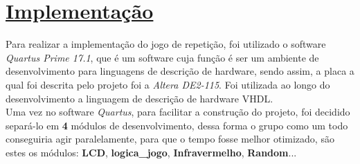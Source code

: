 \documentclass[14pt, oneside]{book}
\newcommand\tab[1][1cm]{\hspace*{#1}}
\theoremstyle{definition}
\begin{document}
            
        \chapter[Implementação]{\hyperlink{toc}{Implementação}}
            \tab Para realizar a implementação do jogo de repetição, foi utilizado o software \textit{Quartus Prime 17.1}, que é um software cuja função é ser um ambiente de desenvolvimento para linguagens de descrição de hardware, sendo assim, a placa a qual foi descrita pelo projeto foi a \textit{Altera DE2-115}. Foi utilizada ao longo do desenvolvimento a linguagem de descrição de hardware VHDL. \\
            \tab Uma vez no software \textit{Quartus}, para facilitar a construção do projeto, foi decidido separá-lo em \textbf{4} módulos de desenvolvimento, dessa forma o grupo como um todo conseguiria agir paralelamente, para que o tempo fosse melhor otimizado, são estes os módulos: \textbf {LCD}, \textbf{logica\_jogo}, \textbf{Infravermelho}, \textbf{Random}...
            
\end{document}
